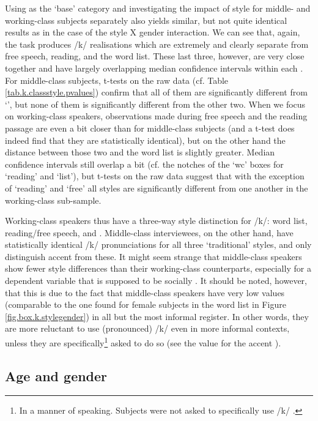 Using  as the `base' category and investigating the impact of style for middle- and working-class subjects separately also yields similar, but not quite identical results as in the case of the style X gender interaction.
We can see that, again, the  task produces /k/ realisations which are extremely  and clearly separate from free speech, reading, and the word list.
These last three, however, are very close together and have largely overlapping median confidence intervals within each .
For middle-class subjects, t-tests on the raw data (cf. Table \ref{tab.k.classstyle.pvalues}) confirm that all of them are significantly different from `', but none of them is significantly different from the other two.
When we focus on working-class speakers, observations made during free speech and the reading passage are even a bit closer than for middle-class subjects (and a t-test does indeed find that they are statistically identical), but on the other hand the distance between those two and the word list is slightly greater.
Median confidence intervals still overlap a bit (cf. the notches of the `wc' boxes for `reading' and `list'), but t-tests on the raw data suggest that with the exception of `reading' and `free' all styles are significantly different from one another in the working-class sub-sample.

Working-class speakers thus have a three-way style distinction for /k/: word list, reading/free speech, and .
Middle-class interviewees, on the other hand, have statistically identical /k/ pronunciations for all three `traditional' styles, and only distinguish accent  from these.
It might seem strange that middle-class speakers show fewer style differences than their working-class counterparts, especially for a dependent variable that is supposed to be socially .
It should be noted, however, that this is due to the fact that middle-class speakers have very low  values (comparable to the one found for female subjects in the word list in Figure \ref{fig.box.k.stylegender}) in all but the most informal register.
In other words, they are more reluctant to use (pronounced) /k/  even in more informal contexts, unless they are specifically\footnote{In a manner of speaking. Subjects were not asked to specifically use /k/ .} asked to do so (see the value for the accent ).

\subsection{Age and gender}
\label{sec.prod.res.con.k.agegender}

